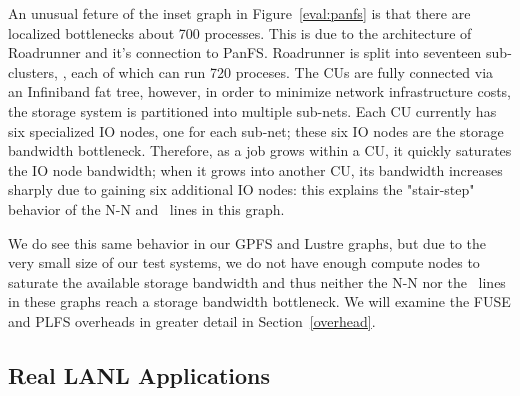 An unusual feture of the inset graph in Figure~\ref{eval:panfs} is that there
are localized bottlenecks about 700 processes.  This is due to the
architecture of Roadrunner and it's connection to PanFS.  Roadrunner is split
into seventeen sub-clusters, , each of which can run 720 proceses.
The CUs are fully connected via an Infiniband fat tree, however, in order to
minimize network infrastructure costs, the storage system is partitioned into
multiple sub-nets. Each CU currently has six specialized IO nodes, one for
each sub-net; these six IO nodes are the storage bandwidth bottleneck.
Therefore, as a job grows within a CU, it quickly saturates the IO node
bandwidth; when it grows into another CU, its bandwidth increases sharply due
to gaining six additional IO nodes: this explains the "stair-step" behavior of
the N-N and \plfs\ lines in this graph. 
 
We do see this same behavior in our GPFS and Lustre graphs, but due to the
very small size of our test systems, we do not have enough compute nodes to
saturate the available storage bandwidth and thus neither the N-N nor the
\plfs\ lines in these graphs reach a storage bandwidth bottleneck. We will
examine the FUSE and PLFS overheads in greater detail in
Section~\ref{overhead}. 

\subsection{Real LANL Applications}

